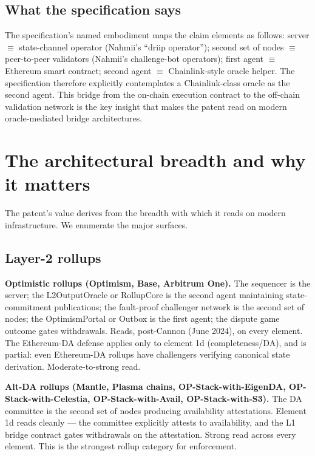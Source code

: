 \documentclass[11pt,letterpaper]{article}
\begin{document}
\subsection{What the specification says}

The specification's named embodiment maps the claim elements as follows: server $\equiv$ state-channel operator (Nahmii's ``driip operator''); second set of nodes $\equiv$ peer-to-peer validators (Nahmii's challenge-bot operators); first agent $\equiv$ Ethereum smart contract; second agent $\equiv$ Chainlink-style oracle helper. The specification therefore explicitly contemplates a Chainlink-class oracle as the second agent. This bridge from the on-chain execution contract to the off-chain validation network is the key insight that makes the patent read on modern oracle-mediated bridge architectures.

\section{The architectural breadth and why it matters}

The patent's value derives from the breadth with which it reads on modern infrastructure. We enumerate the major surfaces.

\subsection{Layer-2 rollups}

\textbf{Optimistic rollups (Optimism, Base, Arbitrum One).} The sequencer is the server; the L2OutputOracle or RollupCore is the second agent maintaining state-commitment publications; the fault-proof challenger network is the second set of nodes; the OptimismPortal or Outbox is the first agent; the dispute game outcome gates withdrawals. Reads, post-Cannon (June 2024), on every element. The Ethereum-DA defense applies only to element 1d (completeness/DA), and is partial: even Ethereum-DA rollups have challengers verifying canonical state derivation. Moderate-to-strong read.

\textbf{Alt-DA rollups (Mantle, Plasma chains, OP-Stack-with-EigenDA, OP-Stack-with-Celestia, OP-Stack-with-Avail, OP-Stack-with-S3).} The DA committee is the second set of nodes producing availability attestations. Element 1d reads cleanly --- the committee explicitly attests to availability, and the L1 bridge contract gates withdrawals on the attestation. Strong read across every element. This is the strongest rollup category for enforcement.
\end{document}
